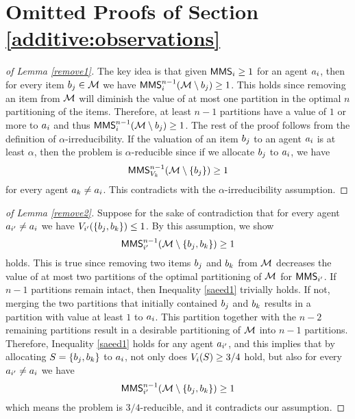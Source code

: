 \section{Omitted Proofs of Section \ref{additive:observations}}\label{additiveobservationsproof}

\begin{proof}[of Lemma \ref{remove1}]
The key idea is that given $\mathsf{MMS}_i \geq 1$ for an agent $a_i$, then for every item $b_j \in \mathcal{M}$ we have 
$\mathsf{MMS}_i^{n-1}(\mathcal{M}\setminus b_j) \geq 1$. This holds since removing an item from $\mathcal{M}$ will diminish the value of at most one partition in the optimal $n$ partitioning of the items. Therefore, at least $n-1$ partitions have a value of $1$ or more to $a_i$ and thus $\mathsf{MMS}_i^{n-1}(\mathcal{M}\setminus b_j) \geq 1$.
The rest of the proof follows from the definition of $\alpha$-irreducibility. If the valuation of an item $b_j$ to an agent $a_i$ is at least $\alpha$, then the problem is $\alpha$-reducible since if we allocate $b_j$ to $a_i$, we have 
$$\mathsf{MMS}_{V_k}^{n-1}(\mathcal{M} \setminus \{b_j\}) \geq 1$$
for every agent $a_k \neq a_i$. This contradicts with the $\alpha$-irreducibility assumption.
\end{proof}

\begin{proof}[of Lemma \ref{remove2}]
Suppose for the sake of contradiction that for every agent $a_{i'} \neq a_i$ we have $V_{i'}(\{b_j,b_k\}) \leq 1$. By this assumption, we show 
\begin{equation}
 \mathsf{MMS}_{i'}^{n-1}(\mathcal{M}\setminus \{b_j,b_k\}) \geq 1 \label{saeed1}
\end{equation} holds. This is true since removing two items $b_j$ and $b_k$ from $\mathcal{M}$ decreases the value of at most two partitions of the optimal partitioning of $\mathcal{M}$ for $\mathsf{MMS}_{i'}$. If $n-1$ partitions remain intact, then Inequality \eqref{saeed1} trivially holds. If not, merging the two partitions that initially contained $b_j$ and $b_k$ results in a partition with value at least $1$ to $a_i$. This partition together with the $n-2$ remaining partitions result in a desirable partitioning of $\mathcal{M}$ into $n-1$ partitions. Therefore, Inequality \eqref{saeed1} holds for any agent $a_{i'}$, and this implies that by allocating $S = \{b_j, b_k\}$ to $a_i$, not only does $V_i(S) \geq 3/4$ hold, but also for every $a_{i'} \neq a_i$ we have 
$$\mathsf{MMS}_{i'}^{n-1}(\mathcal{M}\setminus \{b_j,b_k\}) \geq 1$$
which means the problem is $3/4$-reducible, and it contradicts our assumption.
\end{proof}

